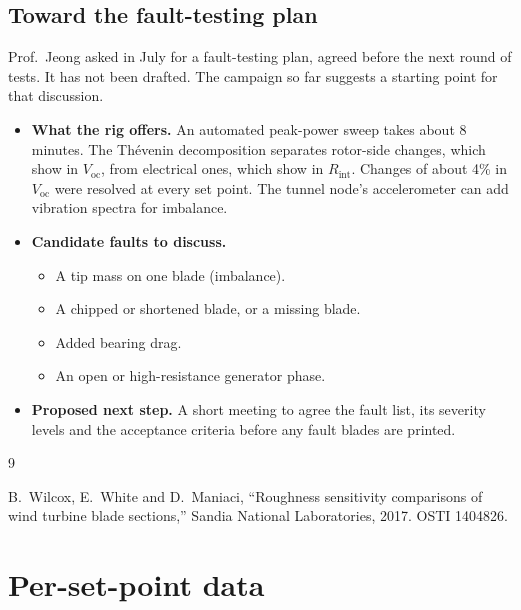 \documentclass[11pt]{article}
\begin{document}
\subsection{Toward the fault-testing plan}\label{sec:faults}
Prof.\ Jeong asked in July for a fault-testing plan, agreed before the next round of tests.
It has not been drafted. The campaign so far suggests a starting point for that discussion.
\begin{itemize}
  \item \textbf{What the rig offers.} An automated peak-power sweep takes about 8 minutes. The
        Thévenin decomposition separates rotor-side changes, which show in $V_\mathrm{oc}$, from
        electrical ones, which show in $R_\mathrm{int}$. Changes of about 4\% in $V_\mathrm{oc}$ were
        resolved at every set point. The tunnel node's accelerometer can add vibration spectra
        for imbalance.
  \item \textbf{Candidate faults to discuss.}
        \begin{itemize}
          \item A tip mass on one blade (imbalance).
          \item A chipped or shortened blade, or a missing blade.
          \item Added bearing drag.
          \item An open or high-resistance generator phase.
        \end{itemize}
  \item \textbf{Proposed next step.} A short meeting to agree the fault list, its severity
        levels and the acceptance criteria before any fault blades are printed.
\end{itemize}

\begin{thebibliography}{9}
 B.\ Wilcox, E.\ White and D.\ Maniaci, ``Roughness sensitivity comparisons of
wind turbine blade sections,'' Sandia National Laboratories, 2017. OSTI 1404826.
\end{thebibliography}

\appendix

\section{Per-set-point data}\label{app:data}
\begin{table}[h]
\centering\footnotesize
\caption{Peak electrical power (W) by rotor and estimator. Wind speed is nominal, from the
commanded fan speed.}\label{tab:data}
\setlength{\tabcolsep}{4.5pt}

\end{table}
\end{document}

